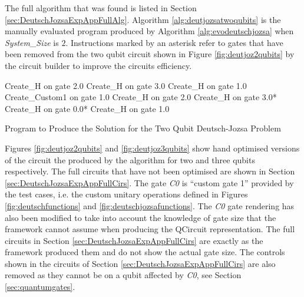 The full algorithm that was found is listed in Section \ref{sec:DeutschJozsaExpAppFullAlg}.
Algorithm \ref{alg:deutjozsatwoqubits} is the manually evaluated program produced by Algorithm \ref{alg:evodeutschjozsa} when \emph{System\_Size} is $2$.
Instructions marked by an asterisk refer to gates that have been removed from the two qubit circuit shown in Figure \ref{fig:deutjoz2qubits} by the circuit builder to improve the circuits efficiency.

\begin{algorithm}
 \begin{algorithmic}
\STATE Create\_H on gate 2.0
\STATE Create\_H on gate 3.0
\STATE Create\_H on gate 1.0
\STATE Create\_Custom1 on gate 1.0
\STATE Create\_H on gate 2.0
\STATE Create\_H on gate 3.0*
\STATE Create\_H on gate 0.0*
\STATE Create\_H on gate 1.0
 \end{algorithmic}
\caption{Program to Produce the Solution for the Two Qubit Deutsch-Jozsa Problem}
\label{alg:deutjozsatwoqubits}
\end{algorithm}


Figures \ref{fig:deutjoz2qubits} and \ref{fig:deutjoz3qubits} show hand optimised versions of the circuit the produced by the algorithm for two and three qubits respectively.
The full circuits that have not been optimised are shown in Section \ref{sec:DeutschJozsaExpAppFullCirs}.
The gate \emph{C0} is ``custom gate 1'' provided by the test cases, i.e. the custom unitary operations defined in Figures \ref{fig:deutschfunctions} and \ref{fig:deutschjozsafunctions}.
The \emph{C0} gate rendering has also been modified to take into account the knowledge of gate size that the framework cannot assume when producing the QCircuit representation.
The full circuits in Section \ref{sec:DeutschJozsaExpAppFullCirs} are exactly as the framework produced them and do not show the actual gate size.
The controls shown in the circuits of Section \ref{sec:DeutschJozsaExpAppFullCirs} are also removed as they cannot be on a qubit affected by \emph{C0}, see Section \ref{sec:quantumgates}.


